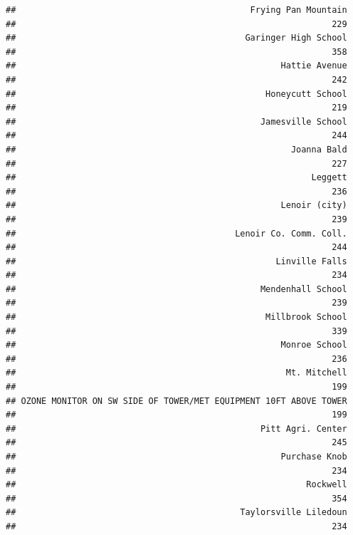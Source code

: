 \documentclass[12pt,]{article}
\begin{document}
\begin{verbatim}
##                                              Frying Pan Mountain 
##                                                              229 
##                                             Garinger High School 
##                                                              358 
##                                                    Hattie Avenue 
##                                                              242 
##                                                 Honeycutt School 
##                                                              219 
##                                                Jamesville School 
##                                                              244 
##                                                      Joanna Bald 
##                                                              227 
##                                                          Leggett 
##                                                              236 
##                                                    Lenoir (city) 
##                                                              239 
##                                           Lenoir Co. Comm. Coll. 
##                                                              244 
##                                                   Linville Falls 
##                                                              234 
##                                                Mendenhall School 
##                                                              239 
##                                                 Millbrook School 
##                                                              339 
##                                                    Monroe School 
##                                                              236 
##                                                     Mt. Mitchell 
##                                                              199 
## OZONE MONITOR ON SW SIDE OF TOWER/MET EQUIPMENT 10FT ABOVE TOWER 
##                                                              199 
##                                                Pitt Agri. Center 
##                                                              245 
##                                                    Purchase Knob 
##                                                              234 
##                                                         Rockwell 
##                                                              354 
##                                            Taylorsville Liledoun 
##                                                              234 

\end{verbatim}
\end{document}
